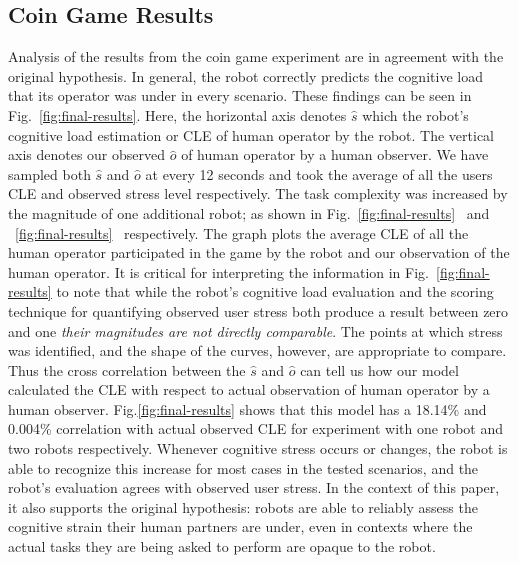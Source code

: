 \documentclass{sig-alternate}
\begin{document}

\subsection{Coin Game Results}

Analysis of the results from the coin game experiment are in agreement
with the original hypothesis. In general, the robot correctly predicts
the cognitive load that its operator was under in every
scenario. These findings can be seen in Fig.~\ref{fig:final-results}.
Here, the horizontal axis denotes $\hat{s}$ which the robot's cognitive load estimation or CLE of human operator by the robot. The vertical axis denotes our observed $\hat{o}$ of human operator by a human observer. We have sampled both $\hat{s}$ and $\hat{o}$ at every 12 seconds and took the average of all the users CLE and observed stress level respectively. The task complexity was increased by the magnitude of one additional robot; as shown in Fig.~\ref{fig:final-results}~ and ~\ref{fig:final-results}~ respectively. The graph plots the average CLE of all the human operator participated in the game by the robot and our observation of the human operator. It is critical for interpreting the
information in Fig.~\ref{fig:final-results} to note that while the robot's
cognitive load evaluation and the scoring technique for quantifying
observed user stress both produce a result between zero and one
\textit{their magnitudes are not directly comparable}. The points at
which stress was identified, and the shape of the curves, however, are
appropriate to compare. Thus the cross correlation between the $\hat{s}$ and $\hat{o}$ can tell us how our model calculated the CLE with respect to actual observation of human operator by a human observer. Fig.\ref{fig:final-results} shows that this model has a 18.14\% and 0.004\% correlation with actual observed CLE for experiment with one robot and two robots respectively. Whenever cognitive stress occurs or changes,
the robot is able to recognize this increase for most cases in the
tested scenarios, and the robot's evaluation agrees with observed
user stress.  In the context of this paper, it also supports the
original hypothesis: robots are able to reliably assess the
cognitive strain their human partners are under, even in contexts
where the actual tasks they are being asked to perform are opaque to
the robot.
\end{document}
